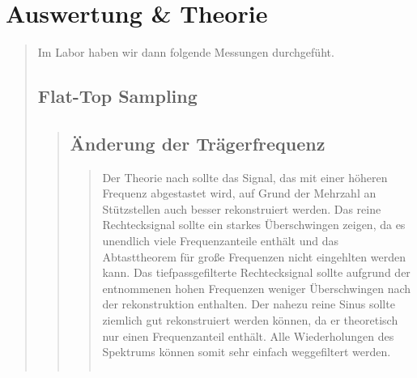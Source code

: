 \section{Auswertung \& Theorie}
\begin{quote}
    
    Im Labor haben wir dann folgende Messungen durchgefüht.
    
    
    \subsection{Flat-Top Sampling}
    \begin{quote}
        
        \subsection{Änderung der Trägerfrequenz}
        \begin{quote}
            
            Der Theorie nach sollte das Signal, das mit einer höheren Frequenz abgestastet wird, auf Grund der Mehrzahl
            an Stützstellen auch besser rekonstruiert werden.
            Das reine Rechtecksignal sollte ein starkes Überschwingen zeigen, da es unendlich viele Frequenzanteile
            enthält und das Abtasttheorem für große Frequenzen nicht eingehlten werden kann.
            Das tiefpassgefilterte Rechtecksignal sollte aufgrund der entnommenen hohen Frequenzen weniger Überschwingen
            nach der rekonstruktion enthalten.
            Der nahezu reine Sinus sollte ziemlich gut rekonstruiert werden können, da er theoretisch nur einen
            Frequenzanteil enthält. Alle Wiederholungen des Spektrums können somit sehr einfach weggefiltert werden.
            
            
            \begin{center}
            \begin{tabular}{ll}
            

\end{tabular}
\end{center}
\end{quote}
\end{quote}
\end{quote}
